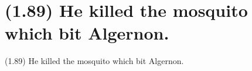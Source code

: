 \documentclass{article}
\begin{document}
\clearpage

%
%

\section*{(1.89) He killed the mosquito which bit Algernon.}

\bigbreak
\begin{enumerate*}
\item[(1.89)] He killed the mosquito which bit Algernon.
\end{enumerate*}
\bigbreak
\end{document}
